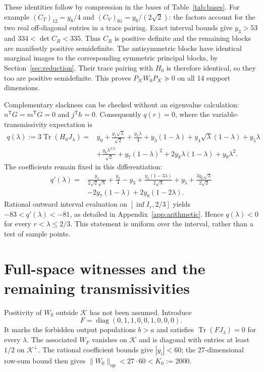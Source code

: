 \documentclass[11pt]{article}
\newcommand{\Tr}{\operatorname{Tr}}
\newcommand{\K}{\mathcal K}
\begin{document}
These identities follow by compression in the bases of Table~\ref{tab:bases}.
For example $(C_T)_{12}=y_6/4$ and $(C_V)_{01}=y_6/(2\sqrt2)$:
the factors account for the two real off-diagonal entries in a trace pairing.
Exact interval bounds give $y_3>53$ and $334<\det C_R<335$.
Thus $C_R$ is positive definite and the remaining blocks are manifestly
positive semidefinite. The antisymmetric blocks have identical marginal
images to the corresponding symmetric principal blocks, by
Section~\ref{sec:reduction}. Their trace pairing with $H_0$ is therefore
identical, so they too are positive semidefinite. This proves
$P_\K W_0P_\K\succeq0$ on all 14 support dimensions.

Complementary slackness can be checked without an eigenvalue calculation:
$n^{\mathsf T}G=m^{\mathsf T}G=0$ and $j^{\mathsf T}h=0$.
Consequently $q(r)=0$, where the variable-transmissivity expectation is
\begin{equation}\label{eq:q}
\begin{split}
q(\lambda):=3\Tr(H_0J_\lambda)
={}&y_0+\frac{y_1\sqrt\lambda}{\sqrt2}+\frac{y_2\lambda}{4}
+y_3(1-\lambda)+y_4\sqrt\lambda(1-\lambda)+y_5\lambda\\
&+\frac{y_6\lambda^{3/2}}{\sqrt2}+y_7(1-\lambda)^2
+2y_8\lambda(1-\lambda)+y_9\lambda^2.
\end{split}
\end{equation}
The coefficients remain fixed in this differentiation:
\begin{equation}\label{eq:qprime}
\begin{split}
q'(\lambda)={}&\frac{y_1}{2\sqrt2\sqrt\lambda}+\frac{y_2}{4}-y_3
+\frac{y_4(1-3\lambda)}{2\sqrt\lambda}+y_5
+\frac{3y_6\sqrt\lambda}{2\sqrt2}\\
&-2y_7(1-\lambda)+2y_8(1-2\lambda).
\end{split}
\end{equation}
Rational outward interval evaluation on $[\inf I_r,2/3]$ yields
$-83<q'(\lambda)<-81$, as detailed in Appendix~\ref{app:arithmetic}.
Hence $q(\lambda)<0$ for every $r<\lambda\leq2/3$.
This statement is uniform over the interval, rather than a test of sample points.

\section{Full-space witnesses and the remaining transmissivities}\label{sec:lift}
Positivity of $W_0$ outside $\K$ has not been assumed. Introduce
\begin{equation}\label{eq:penalty}
F=\operatorname{diag}(0,1,1,0,0,1,0,0,0).
\end{equation}
It marks the forbidden output populations $b>a$ and satisfies
$\Tr(FJ_\lambda)=0$ for every $\lambda$. The associated $W_F$
vanishes on $\K$ and is diagonal with entries at least $1/2$ on
$\K^\perp$. The rational coefficient bounds give $|y_i|<60$;
the 27-dimensional row-sum bound then gives
$\lVert W_0\rVert_{\mathrm{op}}<27\cdot60< K_0:=2000$.
\end{document}
